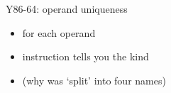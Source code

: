 \begin{frame}[label=Y86operandRule]{Y86-64: operand uniqueness}
\begin{itemize}
\item {} for each operand
\item instruction  tells you the kind
\item (why \movq was `split' into four names)
\end{itemize}
\end{frame}


